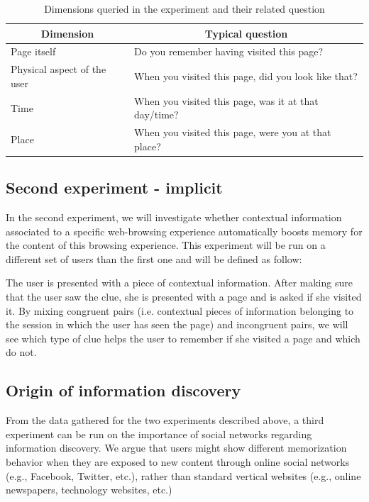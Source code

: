 \documentclass[10pt,a4paper]{article}
\begin{document}
\begin {table}[H]
\begin{center}
\begin{tabular}{|l|l|}
\hline
\multicolumn{1}{|c|}{\textbf{Dimension}} &\multicolumn{1}{|c|}{\textbf{Typical question}}\\
\hline
Page itself &  Do you remember having visited this page?\\ 
\hline
Physical aspect of the user & When you visited this page, did you look like that?\\
\hline
Time & When you visited this page, was it at that day/time?\\ 
\hline
Place & When you visited this page, were you at that place?\\ 
\hline
\end{tabular}
\end{center}
	\caption{ Dimensions queried in the experiment and their related question}
	\label{table:dimensions}
\end {table}

\subsection{Second experiment - implicit}
In the second experiment, we will investigate whether contextual information associated to a specific web-browsing experience automatically boosts memory for the content of this browsing experience. This experiment will be run on a different set of users than the first one and will be defined as follow:

The user is presented with a piece of contextual information. After making sure that the user saw the clue, she is presented with a page and is asked if she visited it. By mixing congruent pairs (i.e. contextual pieces of information belonging to the session in which the user has seen the page) and incongruent pairs, we will see which type of clue helps the user to remember if she visited a page and which do not.

\subsection{Origin of information discovery}
From the data gathered for the two experiments described above, a third experiment can be run on the importance of social networks regarding information discovery. We argue that users might show different memorization behavior when they are exposed to new content through online social networks (e.g., Facebook, Twitter, etc.), rather than standard vertical websites (e.g., online newspapers, technology websites, etc.)
\end{document}
